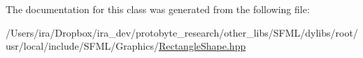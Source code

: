 The documentation for this class was generated from the following file\-:\begin{DoxyCompactItemize}
\item 
/\-Users/ira/\-Dropbox/ira\-\_\-dev/protobyte\-\_\-research/other\-\_\-libs/\-S\-F\-M\-L/dylibs/root/usr/local/include/\-S\-F\-M\-L/\-Graphics/\hyperlink{_rectangle_shape_8hpp}{Rectangle\-Shape.\-hpp}\end{DoxyCompactItemize}
